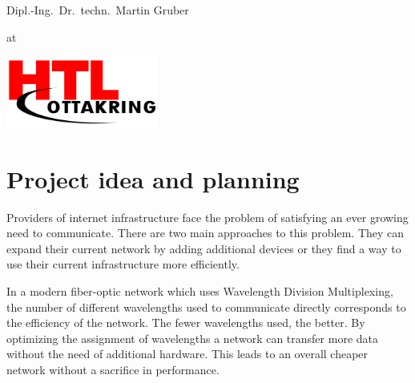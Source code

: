 \documentclass[paper=a4,fontsize=12pt]{scrartcl}
\begin{document}
\begin{titlepage}
\begin{center}
\vspace{5mm}

{\large Dipl.-Ing.\ Dr.\ techn.\ Martin Gruber}

\vspace{5mm}

at

\vspace{5mm}

\includegraphics[width=5cm]{../img/htl.png}

\vspace*{\fill}
\end{center}
\end{titlepage}
\tableofcontents
\newpage

\section{Project idea and planning}

Providers of internet infrastructure face the problem of satisfying an ever growing need to communicate. There are two main approaches to this problem. They can expand their current network by adding additional devices or they find a way to use their current infrastructure more efficiently.


In a modern fiber-optic network which uses Wavelength Division Multiplexing, the number of different wavelengths used to communicate directly corresponds to the efficiency of the network. The fewer wavelengths used, the better. By optimizing the assignment of wavelengths a network can transfer more data without the need of additional hardware. This leads to an overall cheaper network without a sacrifice in performance.
\end{document}
